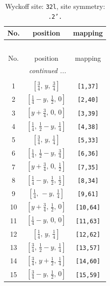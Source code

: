 \documentclass[fleqn,8pt]{jsarticle}
\begin{document}
\begin{longtable}{ccc}
\caption{Wyckoff site: {\tt 32l}, site symmetry: {\tt .2'.}}
 \\
 \hline \hline
No. & position & mapping \\ \hline \endfirsthead

\multicolumn{2}{l}{\tablename\ \thetable{}} \\
 \hline \hline
No. & position & mapping \\ \hline \endhead

 \hline \hline
\multicolumn{2}{r}{\footnotesize\it continued ...} \\ \endfoot

 \hline \hline
\multicolumn{2}{r}{} \\ \endlastfoot

1 & $\left[ \frac{3}{4},\, y,\, \frac{3}{4} \right]$ & {\tt [1,37]} \\ \hline
2 & $\left[ \frac{1}{4} - y,\, \frac{1}{2},\, 0 \right]$ & {\tt [2,40]} \\ \hline
3 & $\left[ y + \frac{3}{4},\, 0,\, 0 \right]$ & {\tt [3,39]} \\ \hline
4 & $\left[ \frac{1}{4},\, \frac{1}{2} - y,\, \frac{1}{4} \right]$ & {\tt [4,38]} \\ \hline
5 & $\left[ \frac{3}{4},\, y,\, \frac{1}{4} \right]$ & {\tt [5,33]} \\ \hline
6 & $\left[ \frac{1}{4},\, \frac{1}{2} - y,\, \frac{3}{4} \right]$ & {\tt [6,36]} \\ \hline
7 & $\left[ y + \frac{3}{4},\, 0,\, \frac{1}{2} \right]$ & {\tt [7,35]} \\ \hline
8 & $\left[ \frac{1}{4} - y,\, \frac{1}{2},\, \frac{1}{2} \right]$ & {\tt [8,34]} \\ \hline
9 & $\left[ \frac{1}{4},\, - y,\, \frac{1}{4} \right]$ & {\tt [9,61]} \\ \hline
10 & $\left[ y + \frac{3}{4},\, \frac{1}{2},\, 0 \right]$ & {\tt [10,64]} \\ \hline
11 & $\left[ \frac{1}{4} - y,\, 0,\, 0 \right]$ & {\tt [11,63]} \\ \hline
12 & $\left[ \frac{1}{4},\, y,\, \frac{1}{4} \right]$ & {\tt [12,62]} \\ \hline
13 & $\left[ \frac{3}{4},\, \frac{1}{2} - y,\, \frac{1}{4} \right]$ & {\tt [13,57]} \\ \hline
14 & $\left[ \frac{3}{4},\, y + \frac{1}{2},\, \frac{1}{4} \right]$ & {\tt [14,60]} \\ \hline
15 & $\left[ \frac{3}{4} - y,\, \frac{1}{2},\, 0 \right]$ & {\tt [15,59]} \\ \hline

\end{longtable}
\end{document}
